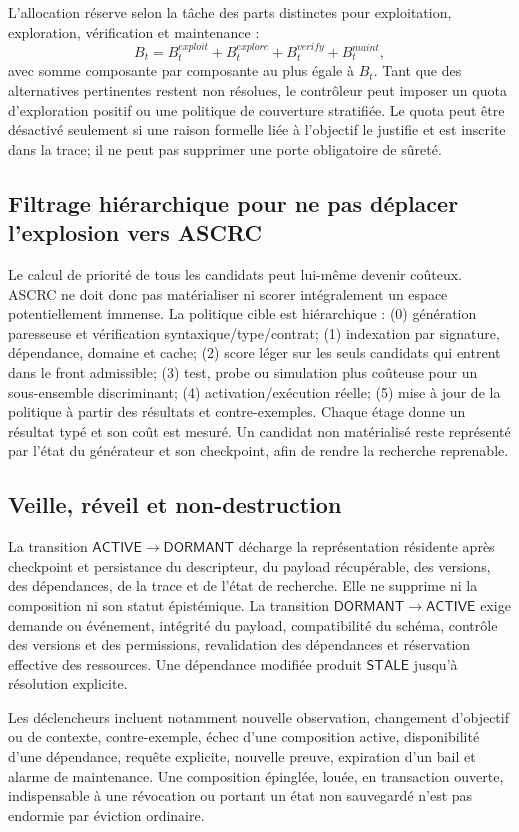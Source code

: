 L'allocation réserve selon la tâche des parts distinctes pour exploitation, exploration, vérification et maintenance :
\[
 B_t=B_t^{exploit}+B_t^{explore}+B_t^{verify}+B_t^{maint},
\]
avec somme composante par composante au plus égale à $B_t$. Tant que des alternatives pertinentes restent non résolues, le contrôleur peut imposer un quota d'exploration positif ou une politique de couverture stratifiée. Le quota peut être désactivé seulement si une raison formelle liée à l'objectif le justifie et est inscrite dans la trace; il ne peut pas supprimer une porte obligatoire de sûreté.

\subsection{Filtrage hiérarchique pour ne pas déplacer l'explosion vers ASCRC}
Le calcul de priorité de tous les candidats peut lui-même devenir coûteux. ASCRC ne doit donc pas matérialiser ni scorer intégralement un espace potentiellement immense. La politique cible est hiérarchique : (0) génération paresseuse et vérification syntaxique/type/contrat; (1) indexation par signature, dépendance, domaine et cache; (2) score léger sur les seuls candidats qui entrent dans le front admissible; (3) test, probe ou simulation plus coûteuse pour un sous-ensemble discriminant; (4) activation/exécution réelle; (5) mise à jour de la politique à partir des résultats et contre-exemples. Chaque étage donne un résultat typé et son coût est mesuré. Un candidat non matérialisé reste représenté par l'état du générateur et son checkpoint, afin de rendre la recherche reprenable.

\subsection{Veille, réveil et non-destruction}
La transition $\mathsf{ACTIVE}\to\mathsf{DORMANT}$ décharge la représentation résidente après checkpoint et persistance du descripteur, du payload récupérable, des versions, des dépendances, de la trace et de l'état de recherche. Elle ne supprime ni la composition ni son statut épistémique. La transition $\mathsf{DORMANT}\to\mathsf{ACTIVE}$ exige demande ou événement, intégrité du payload, compatibilité du schéma, contrôle des versions et des permissions, revalidation des dépendances et réservation effective des ressources. Une dépendance modifiée produit $\mathsf{STALE}$ jusqu'à résolution explicite.

Les déclencheurs incluent notamment nouvelle observation, changement d'objectif ou de contexte, contre-exemple, échec d'une composition active, disponibilité d'une dépendance, requête explicite, nouvelle preuve, expiration d'un bail et alarme de maintenance. Une composition épinglée, louée, en transaction ouverte, indispensable à une révocation ou portant un état non sauvegardé n'est pas endormie par éviction ordinaire.

